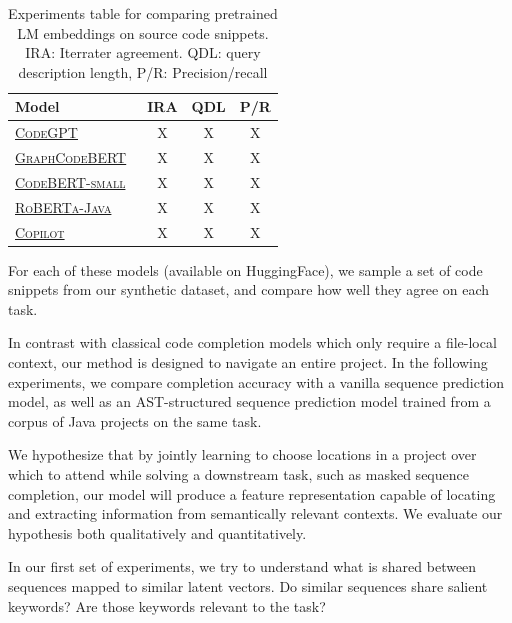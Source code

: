 \documentclass[sigconf,review,anonymous]{acmart}
\begin{document}
  {
    \renewcommand{\arraystretch}{1.5}
    \begin{table}[H]
      \small
      \begin{tabular}{l|ccc}
        Model & IRA & QDL & P/R \\
        \hline
        \href{https://huggingface.co/microsoft/CodeGPT-small-java}{\textsc{CodeGPT}}~\citep{lu2021codexglue} & X & X & X \\
        \href{https://huggingface.co/microsoft/graphcodebert-base}{\textsc{GraphCodeBERT}}~\citep{guo2021graphcodebert} & X & X & X \\
        \href{https://huggingface.co/huggingface/CodeBERTa-small-v1a}{\textsc{CodeBERT-small}}~\citep{feng2020codebert} & X & X & X \\
        \href{https://huggingface.co/dbernsohn/roberta-java}{\textsc{RoBERTa-Java}}~\citep{liu2019roberta} & X & X & X \\
        \href{https://copilot.github.com/}{\textsc{Copilot}}\citep{chen2021evaluating} & X & X & X \\

      \end{tabular}
      \caption{\label{tab:ad_comparison} Experiments table for comparing pretrained LM embeddings on source code snippets. IRA: Iterrater agreement. QDL: query description length, P/R: Precision/recall}
    \end{table}
  }


  For each of these models (available on HuggingFace), we sample a set of code snippets from our synthetic dataset, and compare how well they agree on each task.


  In contrast with classical code completion models which only require a file-local context, our method is designed to navigate an entire project. In the following experiments, we compare completion accuracy with a vanilla sequence prediction model, as well as an AST-structured sequence prediction model trained from a corpus of Java projects on the same task.

  We hypothesize that by jointly learning to choose locations in a project over which to attend while solving a downstream task, such as masked sequence completion, our model will produce a feature representation capable of locating and extracting information from semantically relevant contexts. We evaluate our hypothesis both qualitatively and quantitatively.

  In our first set of experiments, we try to understand what is shared between sequences mapped to similar latent vectors. Do similar sequences share salient keywords? Are those keywords relevant to the task?
\end{document}
